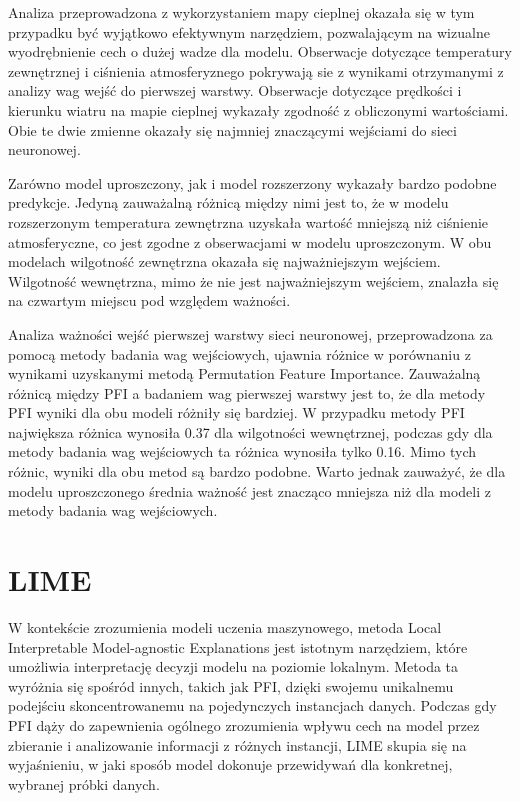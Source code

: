 \documentclass[a4paper,twoside,12pt]{book}
\begin{document}
Analiza przeprowadzona z wykorzystaniem mapy cieplnej okazała się w tym przypadku być wyjątkowo efektywnym narzędziem, pozwalającym na wizualne wyodrębnienie cech o dużej wadze dla modelu. Obserwacje dotyczące temperatury zewnętrznej i ciśnienia atmosferyznego pokrywają sie z wynikami otrzymanymi z analizy wag wejść do pierwszej warstwy. Obserwacje dotyczące prędkości i kierunku wiatru na mapie cieplnej wykazały zgodność z obliczonymi wartościami. Obie te dwie zmienne okazały się najmniej znaczącymi wejściami do sieci neuronowej.

Zarówno model uproszczony, jak i model rozszerzony wykazały bardzo podobne predykcje. Jedyną zauważalną różnicą między nimi jest to, że w modelu rozszerzonym temperatura zewnętrzna uzyskała wartość mniejszą niż ciśnienie atmosferyczne, co jest zgodne z obserwacjami w modelu uproszczonym. W obu modelach wilgotność zewnętrzna okazała się najważniejszym wejściem. Wilgotność wewnętrzna, mimo że nie jest najważniejszym wejściem, znalazła się na czwartym miejscu pod względem ważności.

Analiza ważności wejść pierwszej warstwy sieci neuronowej, przeprowadzona za pomocą metody badania wag wejściowych, ujawnia różnice w porównaniu z wynikami uzyskanymi metodą Permutation Feature Importance. Zauważalną różnicą między PFI a badaniem wag pierwszej warstwy jest to, że dla metody PFI wyniki dla obu modeli różniły się bardziej. W przypadku metody PFI największa różnica wynosiła 0.37 dla wilgotności wewnętrznej, podczas gdy dla metody badania wag wejściowych ta różnica wynosiła tylko 0.16. Mimo tych różnic, wyniki dla obu metod są bardzo podobne. Warto jednak zauważyć, że dla modelu uproszczonego średnia ważność jest znacząco mniejsza niż dla modeli z metody badania wag wejściowych.

\newpage
\section{LIME}
W kontekście zrozumienia modeli uczenia maszynowego, metoda Local Interpretable Model-agnostic Explanations jest istotnym narzędziem, które umożliwia interpretację decyzji modelu na poziomie lokalnym. Metoda ta wyróżnia się spośród innych, takich jak PFI, dzięki swojemu unikalnemu podejściu skoncentrowanemu na pojedynczych instancjach danych. Podczas gdy PFI dąży do zapewnienia ogólnego zrozumienia wpływu cech na model przez zbieranie i analizowanie informacji z różnych instancji, LIME skupia się na wyjaśnieniu, w jaki sposób model dokonuje przewidywań dla konkretnej, wybranej próbki danych.
\end{document}
